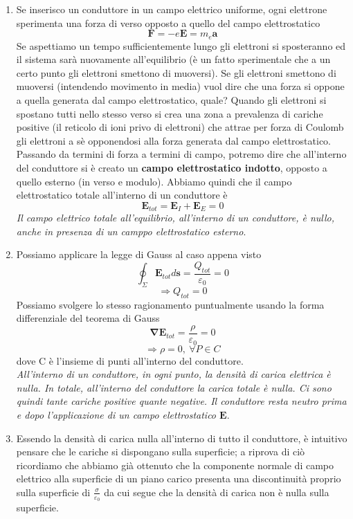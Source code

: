\documentclass[10pt,a4paper]{article}
\begin{document}
\begin{enumerate}
\item	Se inserisco un conduttore in un campo elettrico uniforme, ogni elettrone sperimenta una forza di verso opposto a quello del campo elettrostatico
\[\mathbf{F} = -e\mathbf{E} = m_e \mathbf{a}\]
Se aspettiamo un tempo sufficientemente lungo gli elettroni si sposteranno ed il sistema sarà nuovamente all'equilibrio (è un fatto sperimentale che a un certo punto gli elettroni smettono di muoversi). Se gli elettroni smettono di muoversi (intendendo movimento in media) vuol dire che una forza si oppone a quella generata dal campo elettrostatico, quale? Quando gli elettroni si spostano tutti nello stesso verso si crea una zona a prevalenza di cariche positive (il reticolo di ioni privo di elettroni) che attrae per forza di Coulomb gli elettroni a sè opponendosi alla forza generata dal campo elettrostatico. Passando da termini di forza a termini di campo, potremo dire che all'interno del conduttore si è creato un \textbf{campo elettrostatico indotto}, opposto a quello esterno (in verso e modulo). Abbiamo quindi che il campo elettrostatico totale all'interno di un conduttore è
\[\mathbf{E}_{tot} = \mathbf{E}_I+\mathbf{E}_E = 0\]
\textit{Il campo elettrico totale all'equilibrio, all'interno di un conduttore, è nullo, anche in presenza di un camppo elettrostatico esterno}.
\item Possiamo applicare la legge di Gauss al caso appena visto 
\[\oint_{\Sigma}\mathbf{E}_{tot}d\mathbf{s}= \frac{Q_{tot}}{\varepsilon_0} = 0\]
\[\Rightarrow Q_{tot} = 0\]
Possiamo svolgere lo stesso ragionamento puntualmente usando la forma differenziale del teorema di Gauss
\[\mathbf{\nabla}\mathbf{E}_{tot}=\frac{\rho}{\varepsilon_0}=0 \]
\[\Rightarrow \rho = 0,\ \forall P \in C\]
dove C è l'insieme di punti all'interno del conduttore. \\
\textit{All'interno di un conduttore, in ogni punto, la densità di carica elettrica è nulla. In totale, all'interno del conduttore la carica totale è nulla. Ci sono quindi tante cariche positive quante negative. Il conduttore resta neutro prima e dopo l'applicazione di un campo elettrostatico $\mathbf{E}$}.
\item Essendo la densità di carica nulla all'interno di tutto il conduttore, è intuitivo pensare che le cariche si dispongano sulla superficie; a riprova di ciò ricordiamo che abbiamo già ottenuto che la componente normale di campo elettrico alla superficie di un piano carico presenta una discontinuità proprio sulla superficie di \(\frac{\sigma}{\varepsilon_0}\) da cui segue che la densità di carica non è nulla sulla superficie. \\

\end{enumerate}
\end{document}
